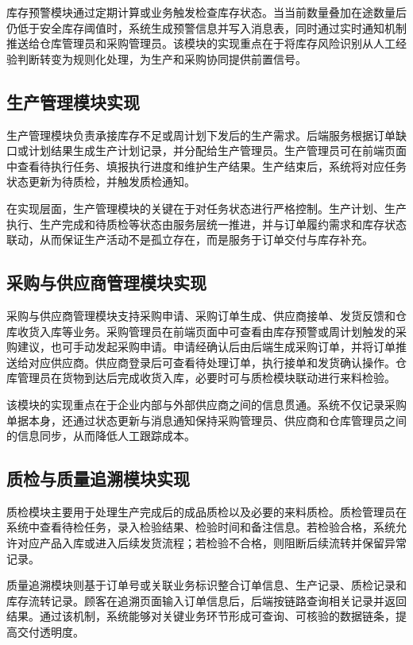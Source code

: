 库存预警模块通过定期计算或业务触发检查库存状态。当当前数量叠加在途数量后仍低于安全库存阈值时，系统生成预警信息并写入消息表，同时通过实时通知机制推送给仓库管理员和采购管理员。该模块的实现重点在于将库存风险识别从人工经验判断转变为规则化处理，为生产和采购协同提供前置信号。

\subsection{生产管理模块实现}

生产管理模块负责承接库存不足或周计划下发后的生产需求。后端服务根据订单缺口或计划结果生成生产计划记录，并分配给生产管理员。生产管理员可在前端页面中查看待执行任务、填报执行进度和维护生产结果。生产结束后，系统将对应任务状态更新为待质检，并触发质检通知。

在实现层面，生产管理模块的关键在于对任务状态进行严格控制。生产计划、生产执行、生产完成和待质检等状态由服务层统一推进，并与订单履约需求和库存状态联动，从而保证生产活动不是孤立存在，而是服务于订单交付与库存补充。

\subsection{采购与供应商管理模块实现}

采购与供应商管理模块支持采购申请、采购订单生成、供应商接单、发货反馈和仓库收货入库等业务。采购管理员在前端页面中可查看由库存预警或周计划触发的采购建议，也可手动发起采购申请。申请经确认后由后端生成采购订单，并将订单推送给对应供应商。供应商登录后可查看待处理订单，执行接单和发货确认操作。仓库管理员在货物到达后完成收货入库，必要时可与质检模块联动进行来料检验。

该模块的实现重点在于企业内部与外部供应商之间的信息贯通。系统不仅记录采购单据本身，还通过状态更新与消息通知保持采购管理员、供应商和仓库管理员之间的信息同步，从而降低人工跟踪成本。

\subsection{质检与质量追溯模块实现}

质检模块主要用于处理生产完成后的成品质检以及必要的来料质检。质检管理员在系统中查看待检任务，录入检验结果、检验时间和备注信息。若检验合格，系统允许对应产品入库或进入后续发货流程；若检验不合格，则阻断后续流转并保留异常记录。

质量追溯模块则基于订单号或关联业务标识整合订单信息、生产记录、质检记录和库存流转记录。顾客在追溯页面输入订单信息后，后端按链路查询相关记录并返回结果。通过该机制，系统能够对关键业务环节形成可查询、可核验的数据链条，提高交付透明度。

